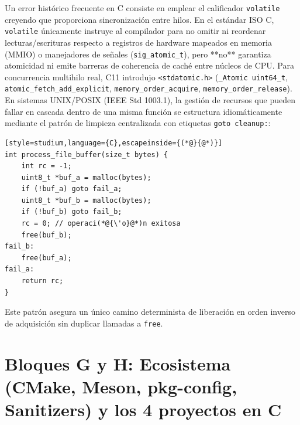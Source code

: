 \documentclass{book}
\begin{document}
Un error histórico frecuente en C consiste en emplear el calificador \texttt{volatile} creyendo que proporciona sincronización entre hilos. En el estándar ISO C, \texttt{volatile} únicamente instruye al compilador para no omitir ni reordenar lecturas/escrituras respecto a registros de hardware mapeados en memoria (MMIO) o manejadores de señales (\texttt{sig\_atomic\_t}), pero **no** garantiza atomicidad ni emite barreras de coherencia de caché entre núcleos de CPU. Para concurrencia multihilo real, C11 introdujo \texttt{<stdatomic.h>} (\texttt{\_Atomic uint64\_t}, \texttt{atomic\_fetch\_add\_explicit}, \texttt{memory\_order\_acquire}, \texttt{memory\_order\_release}). En sistemas UNIX/POSIX (IEEE Std 1003.1), la gestión de recursos que pueden fallar en cascada dentro de una misma función se estructura idiomáticamente mediante el patrón de limpieza centralizada con etiquetas \texttt{goto cleanup:}:
\begin{lstlisting}[style=studium,language={C},escapeinside={(*@}{@*)}]
int process_file_buffer(size_t bytes) {
    int rc = -1;
    uint8_t *buf_a = malloc(bytes);
    if (!buf_a) goto fail_a;
    uint8_t *buf_b = malloc(bytes);
    if (!buf_b) goto fail_b;
    rc = 0; // operaci(*@{\'o}@*)n exitosa
    free(buf_b);
fail_b:
    free(buf_a);
fail_a:
    return rc;
}
\end{lstlisting}
Este patrón asegura un único camino determinista de liberación en orden inverso de adquisición sin duplicar llamadas a \texttt{free}.

\section{Bloques G y H: Ecosistema (CMake, Meson, pkg-config, Sanitizers) y los 4 proyectos en C}
\end{document}
